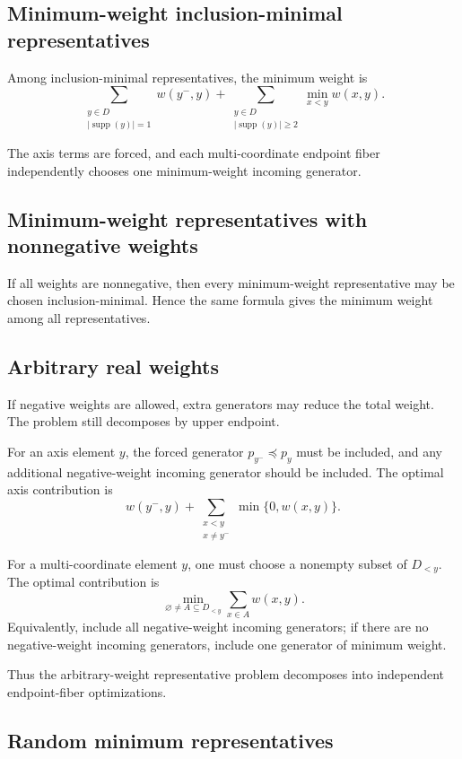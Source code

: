 \documentclass[11pt]{article}
\begin{document}
\subsection{Minimum-weight inclusion-minimal representatives}

Among inclusion-minimal representatives, the minimum weight is
\[
\sum_{\substack{y\in D\\ |\operatorname{supp}(y)|=1}}
w(y^-,y)
+
\sum_{\substack{y\in D\\ |\operatorname{supp}(y)|\ge2}}
\min_{x<y} w(x,y).
\]

The axis terms are forced, and each multi-coordinate endpoint fiber independently chooses one minimum-weight incoming generator.

\subsection{Minimum-weight representatives with nonnegative weights}

If all weights are nonnegative, then every minimum-weight representative may be chosen inclusion-minimal. Hence the same formula gives the minimum weight among all representatives.

\subsection{Arbitrary real weights}

If negative weights are allowed, extra generators may reduce the total weight. The problem still decomposes by upper endpoint.

For an axis element $y$, the forced generator $p_{y^-}\preceq p_y$ must be included, and any additional negative-weight incoming generator should be included. The optimal axis contribution is
\[
w(y^-,y)
+
\sum_{\substack{x<y\\ x\ne y^-}}
\min\{0,w(x,y)\}.
\]

For a multi-coordinate element $y$, one must choose a nonempty subset of $D_{<y}$. The optimal contribution is
\[
\min_{\varnothing\ne A\subseteq D_{<y}}
\sum_{x\in A} w(x,y).
\]
Equivalently, include all negative-weight incoming generators; if there are no negative-weight incoming generators, include one generator of minimum weight.

Thus the arbitrary-weight representative problem decomposes into independent endpoint-fiber optimizations.

\subsection{Random minimum representatives}
\end{document}
